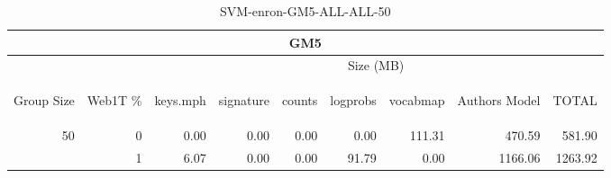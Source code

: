 \begin{center}
\begin{table}[htbp] 
 \begin{center}
\begin{tabular}{ | r | r | r | r | r | r | r | r | r |}
\hline
\multicolumn{9}{|c|}{GM5}\\
\hline
 & & \multicolumn{7}{|c|}{Size (MB)}\\ \cline{3-9}
\begin{sideways}Group Size\end{sideways} & \begin{sideways}Web1T \% \end{sideways} & \begin{sideways}keys.mph\end{sideways} & \begin{sideways}signature\end{sideways} & \begin{sideways}counts\end{sideways} & \begin{sideways}logprobs\end{sideways} & \begin{sideways}vocabmap\end{sideways} & \begin{sideways}Authors Model \end{sideways} & \begin{sideways}TOTAL\end{sideways}\\
\hline
\multirow{1}{*}{50}
 & 0 & 0.00 & 0.00 & 0.00 & 0.00 & 111.31 & 470.59 & 581.90\\ \cline{2-9}
 & 1 & 6.07 & 0.00 & 0.00 & 91.79 & 0.00 & 1166.06 & 1263.92\\ \cline{2-9}
\hline
\end{tabular}
\caption{SVM-enron-GM5-ALL-ALL-50}
\label{table:SVM-enron-GM5-ALL-ALL-50}
\end{center}
 \end{table}
\end{center}

